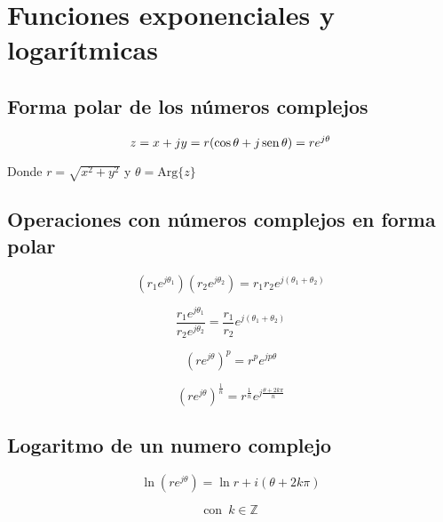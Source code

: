 \chapter*{Funciones exponenciales y logarítmicas}
\section*{Forma polar de los números complejos}

$$z=x+jy=r(\cos \theta + j \operatorname{sen} \theta) = re^{j\theta}$$
\begin{center}
Donde $r=\sqrt{x^2+y^2}$ y $\theta = \mathrm{Arg} \{z \} $ 
\end{center}



\section*{Operaciones con números complejos en forma polar}

$$\left( r_1e^{j\theta_1}\right)\left( r_2e^{j\theta_2}\right)=r_1r_2e^{j(\theta_1+\theta_2)}$$

$$\frac{r_1e^{j\theta_1}}{r_2e^{j\theta_2}}=\frac{r_1}{r_2}e^{j(\theta_1+\theta_2)}$$

$$\left( re^{j\theta}\right)^p=r^pe^{jp\theta}$$

$$\left( re^{j\theta}\right)^{\frac{1}{n}}=r^{\frac{1}{n}}e^{j\frac{\theta+2k\pi}{n}}$$

\section*{Logaritmo de un numero complejo}

$$\ln \left( re^{j\theta} \right) = \ln r + i(\theta + 2k\pi)$$

$$ \mathrm{con} \,\,\, k \in \mathbb{Z}$$